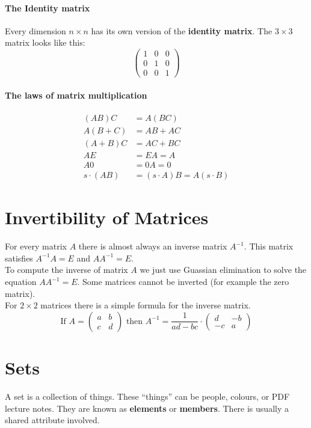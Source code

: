 \documentclass{article}
\begin{document}
\paragraph{The Identity matrix} Every dimension $n\times n$ has its own version of the \textbf{identity matrix}. The $3\times 3$ matrix looks like this:
$$\begin{pmatrix}1 & 0 & 0\\0 & 1 & 0\\0 & 0 & 1\end{pmatrix}$$

\paragraph{The laws of matrix multiplication}
\begin{align*}
(AB)C&=A(BC)\\
A(B+C)&=AB+AC\\
(A+B)C&=AC+BC\\
AE&=EA=A\\
A0&=0A=0\\
s\cdot (AB)&=(s\cdot A)B=A(s\cdot B)
\end{align*}

\section{Invertibility of Matrices}
For every matrix $A$ there is almost always an inverse matrix $A^{-1}$. This matrix satisfies $A^{-1}A=E$ and $AA^{-1}=E$.
\vspace{1mm}\\
To compute the inverse of matrix $A$ we just use Guassian elimination to solve the equation $AA^{-1}=E$. Some matrices cannot be inverted (for example the zero matrix).
\vspace{1mm}\\
For $2\times 2$ matrices there is a simple formula for the inverse matrix.
$$\text{If }A=\begin{pmatrix}a&b\\c&d\end{pmatrix}\text{ then }A^{-1}=\frac{1}{ad-bc}\cdot\begin{pmatrix}d&-b\\-c&a\end{pmatrix}$$

\section{Sets}
A set is a collection of things. These ``things'' can be people, colours, or PDF lecture notes. They are known as \textbf{elements} or \textbf{members}. There is usually a shared attribute involved.
\end{document}
